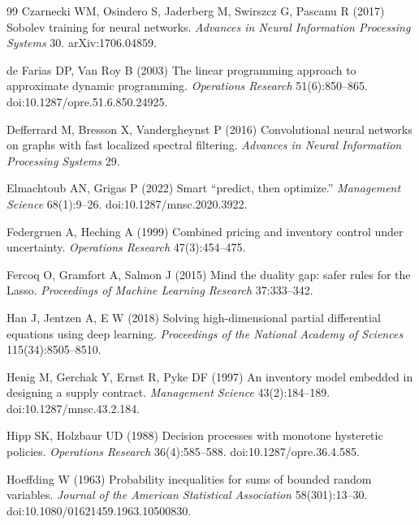 \documentclass[11pt,letterpaper]{article}
\theoremstyle{definition}
\newcommand{\1}{\mathbf 1}
\begin{document}
\begin{thebibliography}{99}
Czarnecki WM, Osindero S, Jaderberg M, Swirszcz G, Pascanu R (2017) Sobolev training for neural networks. \emph{Advances in Neural Information Processing Systems} 30. arXiv:1706.04859.

de Farias DP, Van Roy B (2003) The linear programming approach to approximate dynamic programming. \emph{Operations Research} 51(6):850--865. doi:10.1287/opre.51.6.850.24925.

Defferrard M, Bresson X, Vandergheynst P (2016) Convolutional neural networks on graphs with fast localized spectral filtering. \emph{Advances in Neural Information Processing Systems} 29.

Elmachtoub AN, Grigas P (2022) Smart ``predict, then optimize.'' \emph{Management Science} 68(1):9--26. doi:10.1287/mnsc.2020.3922.

Federgruen A, Heching A (1999) Combined pricing and inventory control under uncertainty. \emph{Operations Research} 47(3):454--475.

Fercoq O, Gramfort A, Salmon J (2015) Mind the duality gap: safer rules for the Lasso. \emph{Proceedings of Machine Learning Research} 37:333--342.

Han J, Jentzen A, E W (2018) Solving high-dimensional partial differential equations using deep learning. \emph{Proceedings of the National Academy of Sciences} 115(34):8505--8510.

Henig M, Gerchak Y, Ernst R, Pyke DF (1997) An inventory model embedded in designing a supply contract. \emph{Management Science} 43(2):184--189. doi:10.1287/mnsc.43.2.184.

Hipp SK, Holzbaur UD (1988) Decision processes with monotone hysteretic policies. \emph{Operations Research} 36(4):585--588. doi:10.1287/opre.36.4.585.

Hoeffding W (1963) Probability inequalities for sums of bounded random variables. \emph{Journal of the American Statistical Association} 58(301):13--30. doi:10.1080/01621459.1963.10500830.


\end{thebibliography}
\end{document}
